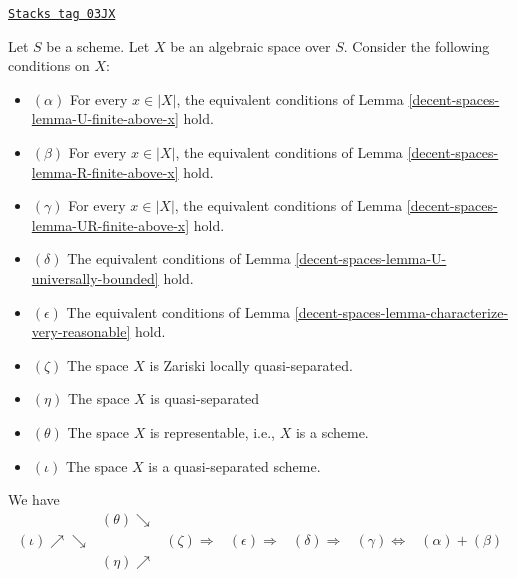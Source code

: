 \begin{lemma}
\label{decent-spaces-lemma-bounded-fibres}
\href{https://stacks.math.columbia.edu/tag/03JX}{\texttt{Stacks tag 03JX}}

Let $S$ be a scheme. Let $X$ be an algebraic space over $S$.
Consider the following conditions on $X$:
\begin{itemize}
\item[] $(\alpha)$ For every $x \in |X|$, the equivalent conditions of
Lemma \ref{decent-spaces-lemma-U-finite-above-x}
hold.
\item[] $(\beta)$ For every $x \in |X|$, the equivalent conditions of
Lemma \ref{decent-spaces-lemma-R-finite-above-x}
hold.
\item[] $(\gamma)$ For every $x \in |X|$, the equivalent conditions of
Lemma \ref{decent-spaces-lemma-UR-finite-above-x}
hold.
\item[] $(\delta)$ The equivalent conditions of
Lemma \ref{decent-spaces-lemma-U-universally-bounded}
hold.
\item[] $(\epsilon)$ The equivalent conditions of
Lemma \ref{decent-spaces-lemma-characterize-very-reasonable}
hold.
\item[] $(\zeta)$ The space $X$ is Zariski locally quasi-separated.
\item[] $(\eta)$ The space $X$ is quasi-separated
\item[] $(\theta)$ The space $X$ is representable, i.e., $X$ is a scheme.
\item[] $(\iota)$ The space $X$ is a quasi-separated scheme.
\end{itemize}
We have
$$
\begin{array}{ccccccc} & (\theta) \searrow &  &  &  &  &  \\ (\iota) \nearrow\searrow &  & (\zeta) \Longrightarrow & (\epsilon) \Longrightarrow & (\delta) \Longrightarrow & (\gamma) \Longleftrightarrow & (\alpha) + (\beta) \\  & (\eta) \nearrow &  &  &  &  & \end{array}
$$
\end{lemma}


